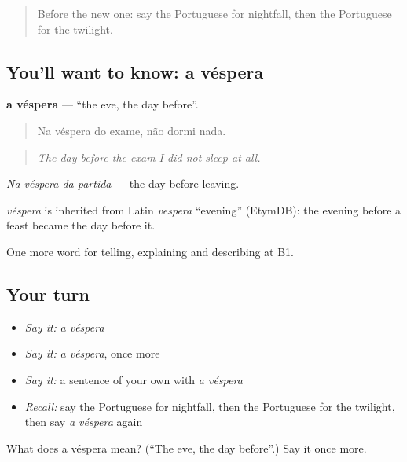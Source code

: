\label{lesson:PT-C275-vespera}



\begin{quote}
Before the new one: say the Portuguese for nightfall, then the Portuguese for the twilight.
\end{quote}

\subsection*{You'll want to know: a véspera}
\textbf{a véspera} — \textquotedblleft{}the eve, the day before\textquotedblright{}.

\begin{quote}
Na véspera do exame, não dormi nada.
\end{quote}

\begin{quote}
\emph{The day before the exam I did not sleep at all.}
\end{quote}

\emph{Na véspera da partida} — the day before leaving.

\begin{cousinweb}
\emph{véspera} is inherited from Latin \emph{vespera} \textquotedblleft{}evening\textquotedblright{} (EtymDB): the evening before a feast became the day before it.
\end{cousinweb}

\begin{grammarlens}[title={What you've built}]
One more word for telling, explaining and describing at B1.
\end{grammarlens}

\subsection*{Your turn}
\begin{itemize}
\raggedright
  \item \emph{Say it:} \emph{a véspera}
  \item \emph{Say it:} \emph{a véspera}, once more
  \item \emph{Say it:} a sentence of your own with \emph{a véspera}
  \item \emph{Recall:} say the Portuguese for nightfall, then the Portuguese for the twilight, then say \emph{a véspera} again
\end{itemize}

\begin{tcolorbox}[breakable,colback=teal!4,colframe=teal!35!black,title={Before you move on}]
What does a véspera mean? (\textquotedblleft{}The eve, the day before\textquotedblright{}.) Say it once more.
\end{tcolorbox}
